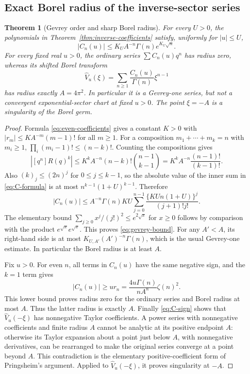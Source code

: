 \documentclass[11pt,a4paper]{article}
\numberwithin{equation}{section}
\newtheorem{theorem}{Theorem}[section]
\theoremstyle{definition}\newtheorem{definition}[theorem]{Definition}
\theoremstyle{remark}\newtheorem{remark}[theorem]{Remark}
\begin{document}
\subsection{Exact Borel radius of the inverse-sector series}
\begin{theorem}[Gevrey order and sharp Borel radius]
\label{thm:inverse-gevrey}
For every $U>0$, the polynomials in
Theorem~\ref{thm:inverse-coefficients} satisfy, uniformly for
$|u|\le U$,
\begin{equation}\label{eq:gevrey-bound}
 |C_n(u)|\le K_U A^{-n}\Gamma(n)e^{K_U\sqrt n}.
\end{equation}
For every fixed real $u>0$, the ordinary series
$\sum C_n(u)q^n$ has radius zero, whereas its shifted Borel transform
\begin{equation}\label{eq:inverse-borel}
 \widehat V_u(\xi)=\sum_{n\ge1}\frac{C_n(u)}{\Gamma(n)}\xi^{n-1}
\end{equation}
has radius exactly $A=4\pi^2$. In particular it is a Gevrey-one
series, but not a convergent exponential-sector chart at fixed $u>0$.
The point $\xi=-A$ is a singularity of the Borel germ.
\end{theorem}
\begin{proof}
Formula \eqref{eq:even-coefficients} gives a constant $K>0$ with
$|r_m|\le K A^{-m}(m-1)!$ for all $m\ge1$.
For a composition $m_1+\cdots+m_k=n$ with $m_i\ge1$,
$\prod_i(m_i-1)!\le(n-k)!$. Counting the compositions gives
\begin{equation}\label{eq:composition-bound}
 |[q^n]R(q)^k|
 \le K^k A^{-n}(n-k)!\binom{n-1}{k-1}
 =K^k A^{-n}\frac{(n-1)!}{(k-1)!}.
\end{equation}
Also $(k)_j\le(2n)^j$ for $0\le j\le k-1$, so the absolute
value of the inner sum in \eqref{eq:C-formula} is at most
$n^{k-1}(1+U)^{k-1}$. Therefore
\[
 |C_n(u)|\le A^{-n}\Gamma(n)KU
 \sum_{j=0}^{n-1}\frac{\{KUn(1+U)\}^j}{(j+1)!j!}.
\]
The elementary bound
$\sum_{j\ge0}x^j/(j!)^2\le e^{2\sqrt x}$ for $x\ge0$
follows by comparison with the product
$e^{\sqrt x}e^{\sqrt x}$. This proves \eqref{eq:gevrey-bound}.
For any $A'<A$, its right-hand side is at most
$K_{U,A'}(A')^{-n}\Gamma(n)$, which is the usual Gevrey-one
estimate. In particular the Borel radius is at least $A$.

Fix $u>0$. For even $n$, all terms in $C_n(u)$ have the same
negative sign, and the $k=1$ term gives
\[
 |C_n(u)|\ge u r_n
 =\frac{4u\Gamma(n)}{nA^n}\zeta(n)^2.
\]
This lower bound proves radius zero for the ordinary series and Borel
radius at most $A$. Thus the latter radius is exactly $A$.
Finally \eqref{eq:C-sign} shows that $\widehat V_u(-\xi)$ has
nonnegative Taylor coefficients. A power series with nonnegative
coefficients and finite radius $A$ cannot be analytic at its positive
endpoint $A$: otherwise its Taylor expansion about a point just below
$A$, with nonnegative derivatives, can be rearranged to make the
original series converge at a point beyond $A$. This contradiction
is the elementary positive-coefficient form of Pringsheim's argument.
Applied to $\widehat V_u(-\xi)$, it proves singularity at $-A$.
\end{proof}
\end{document}

